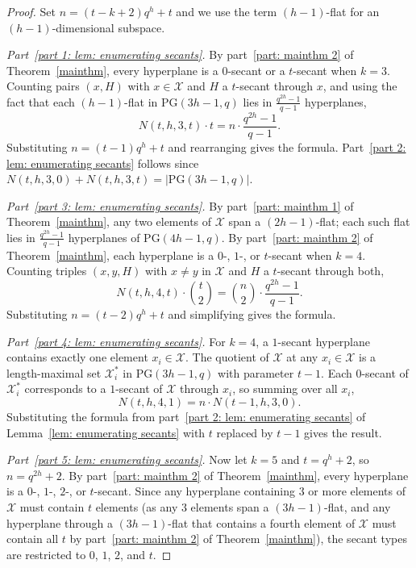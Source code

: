 \documentclass[10pt,a4paper]{amsart}
\begin{document}
	\begin{proof}
		Set $n = (t-k+2)q^h+t$ and we use the term $(h-1)$-flat for an $(h-1)$-dimensional subspace.
		
		\medskip\noindent\textit{Part~\ref{part 1: lem: enumerating secants}.}
		By part~\ref{part: mainthm 2} of Theorem~\ref{mainthm}, every hyperplane is a $0$-secant or a $t$-secant when $k=3$. Counting pairs $(x,H)$ with $x \in \mathcal{X}$ and $H$ a $t$-secant through $x$, and using the fact that each $(h-1)$-flat in $\mathrm{PG}(3h-1,q)$ lies in $\frac{q^{2h}-1}{q-1}$ hyperplanes,
		$$
		N(t,h,3,t)\cdot t = n\cdot \frac{q^{2h}-1}{q-1}.
		$$
		Substituting $n=(t-1)q^h+t$ and rearranging gives the formula. Part~\ref{part 2: lem: enumerating secants} follows since $N(t,h,3,0)+N(t,h,3,t)=|\mathrm{PG}(3h-1,q)|$.
		
		\medskip\noindent\textit{Part~\ref{part 3: lem: enumerating secants}.}
		By part~\ref{part: mainthm 1} of Theorem~\ref{mainthm}, any two elements of $\mathcal{X}$ span a $(2h-1)$-flat; each such flat lies in $\frac{q^{2h}-1}{q-1}$ hyperplanes of $\mathrm{PG}(4h-1,q)$. By part~\ref{part: mainthm 2} of Theorem~\ref{mainthm}, each hyperplane is a $0$-, $1$-, or $t$-secant when $k=4$. Counting triples $(x,y,H)$ with $x \ne y$ in $\mathcal{X}$ and $H$ a $t$-secant through both,
		$$
		N(t,h,4,t)\cdot \binom{t}{2} = \binom{n}{2} \cdot \frac{q^{2h}-1}{q-1}.
		$$
		Substituting $n=(t-2)q^h+t$ and simplifying gives the formula.
		
		\medskip\noindent\textit{Part~\ref{part 4: lem: enumerating secants}.}
		For $k=4$, a $1$-secant hyperplane contains exactly one element $x_i \in \mathcal{X}$. The quotient of $\mathcal{X}$ at any $x_i \in \mathcal{X}$ is a length-maximal set $\mathcal{X}_i^*$ in $\mathrm{PG}(3h-1,q)$ with parameter $t-1$. Each $0$-secant of $\mathcal{X}_i^*$ corresponds to a $1$-secant of $\mathcal{X}$ through $x_i$, so summing over all $x_i$,
		$$
		N(t,h,4,1) = n \cdot N(t-1,h,3,0).
		$$
		Substituting the formula from part~\ref{part 2: lem: enumerating secants} of Lemma~\ref{lem: enumerating secants} with $t$ replaced by $t-1$ gives the result.
		
		\medskip\noindent\textit{Part~\ref{part 5: lem: enumerating secants}.}
		Now let $k=5$ and $t=q^h+2$, so $n=q^{2h}+2$. By part~\ref{part: mainthm 2} of Theorem~\ref{mainthm}, every hyperplane is a $0$-, $1$-, $2$-, or $t$-secant. Since any hyperplane containing $3$ or more elements of $\mathcal{X}$ must contain $t$ elements (as any $3$ elements span a $(3h-1)$-flat, and any hyperplane through a $(3h-1)$-flat that contains a fourth element of $\mathcal{X}$ must contain all $t$ by part~\ref{part: mainthm 2} of Theorem~\ref{mainthm}), the secant types are restricted to $0$, $1$, $2$, and $t$.
		

\end{proof}
\end{document}
